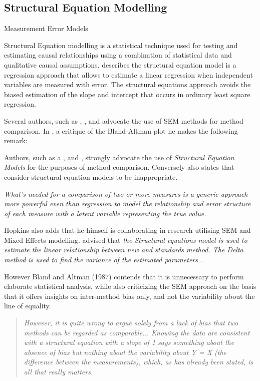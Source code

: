\documentclass[12pt, a4paper]{report}
\theoremstyle{plain}
\theoremstyle{definition}
\theoremstyle{remark}
\begin{document}
	
	
	
	
	
	
	
	\subsection{Structural Equation Modelling}
	\citet{nawarathna2015} Measurement Error Models
	
	
	
	Structural Equation modelling is a statistical technique used for testing and estimating causal relationships using a combination of statistical data and qualitative causal assumptions. \citet{carrasco2004} describes the structural equation model is a regression approach that allows to estimate a linear 
	regression when independent variables are measured with error.
	The structural equations approach avoids the biased estimation of the slope and intercept that occurs in ordinary least square regression.
	
	
	Several authors, such as \citet{lewis1991}, \citet{gkelly1985},\citet{voelkel2005} and \citet{hopkins2004bias} advocate the use of SEM methods for method comparison. In \citet{hopkins2004bias}, a critique of the Bland-Altman plot he makes the following remark:
	
	Authors, such as a \citet{lewis1991}, \citet{dunnSEME} and \citet{voelkel2005}, strongly advocate the use of \textit{Structural Equation Models} for the purposes of method comparison. Conversely \citet{BA99} also states that consider structural equation models to be inappropriate.
	
	\emph{What's needed for a comparison of two or more measures is a
		generic approach more powerful even than regression to model the
		relationship and error structure of each measure with a latent
		variable representing the true value.}
	
	Hopkins also adds that he himself is collaborating in research utilising SEM and Mixed Effects modelling. \citet{gkelly1985} advised that \textit{the Structural equations model is used to estimate the linear relationship between new and standards method.
		The Delta method is used to find the variance of the estimated parameters} \citep{gkelly1985}.
	
	
	However Bland and Altman (1987) contends that it is unnecessary to perform elaborate statistical analysis, while also criticizing the SEM approach on the basis that it offers insights  on inter-method bias only, and not the variability about the line of equality. 
	\begin{quote}
		\textit{	However, it is quite wrong to argue solely from a lack of bias that two methods can be regarded as comparable...
			Knowing the data are consistent with a structural equation with a slope of 1 says something 
			about the absence of bias but nothing about the variability about Y = X (the difference between the measurements), which, as has already been stated, is all that really matters.}
	\end{quote}
	
\end{document}
